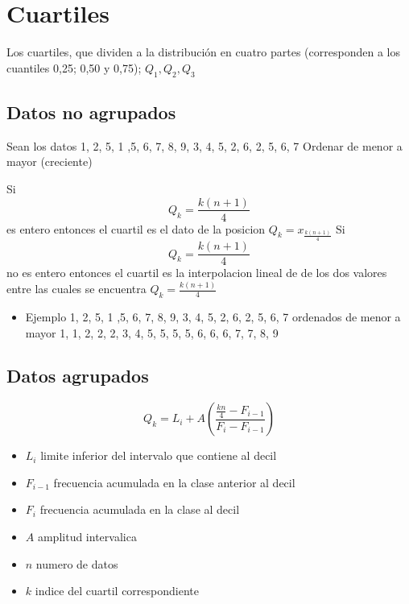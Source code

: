 \documentclass[10pt,]{krantz}
\providecommand{\tightlist}{%
  \setlength{\itemsep}{0pt}\setlength{\parskip}{0pt}}
\theoremstyle{definition}
\theoremstyle{definition}
\theoremstyle{definition}
\theoremstyle{definition}
\theoremstyle{remark}
\begin{document}
\hypertarget{cuartiles}{%
\section{Cuartiles}\label{cuartiles}}

Los cuartiles, que dividen a la distribución en cuatro partes (corresponden a los cuantiles 0,25; 0,50 y 0,75); \(Q_1, Q_2, Q_3\)

\hypertarget{datos-no-agrupados}{%
\subsection{Datos no agrupados}\label{datos-no-agrupados}}

Sean los datos 1, 2, 5, 1 ,5, 6, 7, 8, 9, 3, 4, 5, 2, 6, 2, 5, 6, 7 Ordenar de menor a mayor (creciente)

Si \[Q_k=\frac{k(n+1)}{4}\] es entero entonces el cuartil es el dato de la posicion \(Q_k=x_\frac{k(n+1)}{4}\)
Si \[Q_k=\frac{k(n+1)}{4}\] no es entero entonces el cuartil es la interpolacion lineal de de los dos valores entre las cuales se encuentra \(Q_k=\frac{k(n+1)}{4}\)

\begin{itemize}
\tightlist
\item
  Ejemplo
  1, 2, 5, 1 ,5, 6, 7, 8, 9, 3, 4, 5, 2, 6, 2, 5, 6, 7 ordenados de menor a mayor
  1, 1, 2, 2, 2, 3, 4, 5, 5, 5, 5, 6, 6, 6, 7, 7, 8, 9
\end{itemize}

\hypertarget{datos-agrupados}{%
\subsection{Datos agrupados}\label{datos-agrupados}}

\[Q_k=L_i+ A\left(\frac{\frac{kn}{4}-F_{i-1}}{F_i-F_{i-1}}\right)\]

\begin{itemize}
\tightlist
\item
  \(L_i\) limite inferior del intervalo que contiene al decil
\item
  \(F_{i-1}\) frecuencia acumulada en la clase anterior al decil
\item
  \(F_i\) frecuencia acumulada en la clase al decil
\item
  \(A\) amplitud intervalica
\item
  \(n\) numero de datos
\item
  \(k\) indice del cuartil correspondiente
\end{itemize}
\end{document}
